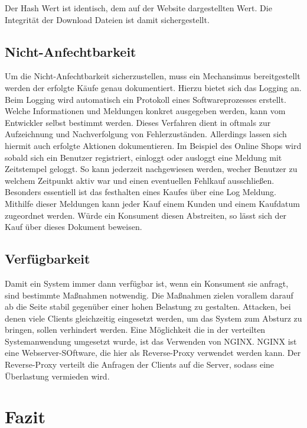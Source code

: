 \documentclass[utf8,biblatex]{lni}
\begin{document}
Der Hash Wert ist identisch, dem auf der Website dargestellten Wert. 
Die Integrität der Download Dateien ist damit sichergestellt. 

\subsection{Nicht-Anfechtbarkeit}

Um die Nicht-Anfechtbarkeit sicherzustellen, muss ein Mechansimus bereitgestellt werden der erfolgte Käufe genau dokumentiert. Hierzu bietet sich das Logging an. Beim Logging wird automatisch ein Protokoll
eines Softwareprozesses erstellt. Welche Informationen und Meldungen konkret ausgegeben werden, kann vom Entwickler selbst bestimmt werden. Dieses Verfahren dient in oftmals zur Aufzeichnung und Nachverfolgung
von Fehlerzuständen. Allerdings lassen sich hiermit auch erfolgte Aktionen dokumentieren. Im Beispiel des Online Shops wird sobald sich ein Benutzer registriert, einloggt oder ausloggt eine Meldung mit Zeitstempel geloggt.
So kann jederzeit nachgewiesen werden, wecher Benutzer zu welchem Zeitpunkt aktiv war und einen eventuellen Fehlkauf ausschließen. Besonders essentiell ist das festhalten eines Kaufes über eine Log Meldung. Mithilfe
dieser Meldungen kann jeder Kauf einem Kunden und einem Kaufdatum zugeordnet werden. Würde ein Konsument diesen Abstreiten, so lässt sich der Kauf über dieses Dokument beweisen. 

\subsection{Verfügbarkeit}

Damit ein System immer dann verfügbar ist, wenn ein Konsument sie anfragt, sind bestimmte Maßnahmen notwendig. Die Maßnahmen zielen vorallem
darauf ab die Seite stabil gegenüber einer hohen Belastung zu gestalten. Attacken, bei denen viele Clients gleichzeitig eingesetzt werden, um das System 
zum Absturz zu bringen, sollen verhindert werden. Eine Möglichkeit die in der verteilten Systemanwendung umgesetzt wurde, ist das Verwenden von NGINX.
NGINX ist eine Webserver-SOftware, die hier als Reverse-Proxy verwendet werden kann. Der Reverse-Proxy verteilt die Anfragen der Clients auf die Server, sodass
eine Überlastung vermieden wird.


\section{Fazit}



\printbibliography
\end{document}
